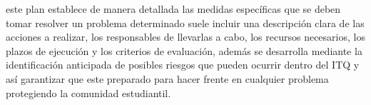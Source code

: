     este plan  establece de manera detallada las medidas específicas que se deben tomar resolver un problema determinado suele incluir una descripción clara de las acciones a realizar, los responsables de llevarlas a cabo, los recursos necesarios, los plazos de ejecución y los criterios de evaluación, además se desarrolla mediante la identificación anticipada de posibles riesgos que pueden ocurrir dentro del ITQ y así garantizar que este preparado para hacer frente en cualquier problema protegiendo la comunidad estudiantil. 

